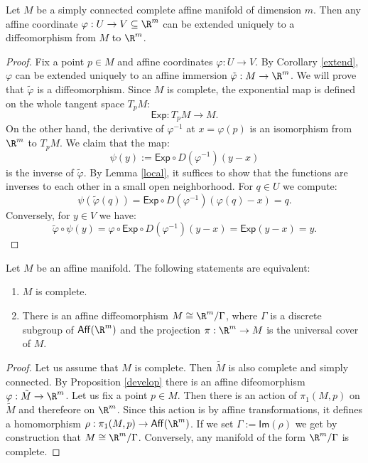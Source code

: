 \begin{lemma}\label{local}
	Let $M$ be a simply connected complete affine manifold of dimension $m$. Then any affine coordinate $\varphi: U \rightarrow V\subseteq \R^m$ can be extended uniquely to a diffeomorphism from $M$ to $\R^m$.
\end{lemma}
\begin{proof}
	Fix a point $p \in M$ and affine coordinates $\varphi: U \rightarrow V$. By Corollary \ref{extend},
	$\varphi$ can be extended uniquely to an affine immersion $\tilde{\varphi}: M \rightarrow \R^m$. We will prove that $\tilde{\varphi}$ is a diffeomorphism. Since $M$ is complete, the exponential map is defined on the whole tangent space $T_pM$:
	\[ \mathsf{Exp}: T_pM \rightarrow M.\]
	On the other hand, the derivative of $\varphi^{-1}$ at $x=\varphi(p)$ is an isomorphism from $\R^m$ to $T_pM$. We claim that
	the map: \[\psi(y):=\mathsf{Exp} \circ D(\varphi^{-1})(y-x)\]
	is the inverse of $\tilde{\varphi}$. By Lemma \ref{local}, it suffices to show that the functions are inverses to each other in a small open neighborhood. For $q \in U$ we compute:
	\[ \psi (\tilde{\varphi}(q))= \mathsf{Exp} \circ D(\varphi^{-1})(\varphi(q)-x)=q.\]
	Conversely, for $y \in V$ we have:
	\[ \tilde{\varphi}\circ \psi(y)= \varphi \circ \mathsf{Exp} \circ  D(\varphi^{-1})(y-x)= \mathsf{Exp}(y-x)=y. \]
\end{proof}


\begin{proposition}\label{develop} 
	Let $M$ be an affine manifold. The following statements are equivalent:
	\begin{enumerate}
		\item  $M$ is complete.
		\item There is an affine diffeomorphism $M \cong \R^m /\Gamma$, where $\Gamma$ is a discrete subgroup of $\mathsf{Aff}(\R^m)$ and the projection $\pi: \R^m \rightarrow M$ is the universal cover of $M$.
	\end{enumerate}
\end{proposition}

\begin{proof}
	Let us assume that $M$ is complete. Then $\tilde{M}$ is also complete and simply connected. By Proposition \ref{develop} there is an affine difeomorphism $\varphi: \tilde{M} \rightarrow \R^m$. Let us fix a point $p \in M$. Then there is an action of $\pi_1(M,p)$ on $\tilde{M}$ and therefeore on $\R^m$. Since this action is by affine transformations, it defines a homomorphism $\rho: \pi_1(M,p) \rightarrow \mathsf{Aff}(\R^m)$. If we set $\Gamma:= \mathsf{Im}(\rho)$ we get by construction that $ M \cong \R^m/\Gamma$. Conversely, any manifold of the form $\R^m/\Gamma$ is complete.
	
	
\end{proof}